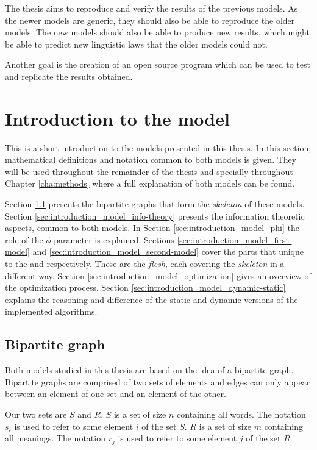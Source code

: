 The thesis aims to reproduce and verify the results of the previous models.
As the newer models are generic, they should also be able to reproduce the older models.
The new models should also be able to produce new results, which might be able to predict new linguistic laws that the older models could not.

Another goal is the creation of an open source program which can be used to test and replicate the results obtained.

\section{Introduction to the model}
\label{sec:introduction_model}

This is a short introduction to the models presented in this thesis.
In this section, mathematical definitions and notation common to both models is given.
They will be used throughout the remainder of the thesis and specially throughout Chapter \ref{cha:methods} where a full explanation of both models can be found.

Section \ref{sec:introduction_model_graph} presents the bipartite graphs that form the \emph{skeleton} of these models.
Section \ref{sec:introduction_model_info-theory} presents the information theoretic aspects, common to both models.
In Section \ref{sec:introduction_model_phi} the role of the $\phi$ parameter is explained.
Sections \ref{sec:introduction_model_first-model} and \ref{sec:introduction_model_second-model} cover the parts that unique to the \firstm{} and \secondmodel{} respectively. These are the \emph{flesh}, each covering the \emph{skeleton} in a different way.
Section \ref{sec:introduction_model_optimization} gives an overview of the optimization process.
Section \ref{sec:introduction_model_dynamic-static} explains the reasoning and difference of the static and dynamic versions of the implemented algorithms.

\subsection{Bipartite graph}
\label{sec:introduction_model_graph}

Both models studied in this thesis are based on the idea of a bipartite graph.
Bipartite graphs are comprised of two sets of elements and edges can only appear between an element of one set and an element of the other.

Our two sets are $S$ and $R$.
$S$ is a set of size $n$ containing all words.
The notation $s_i$ is used to refer to some element $i$ of the set $S$.
$R$ is a set of size $m$ containing all meanings.
The notation $r_j$ is used to refer to some element $j$ of the set $R$.

